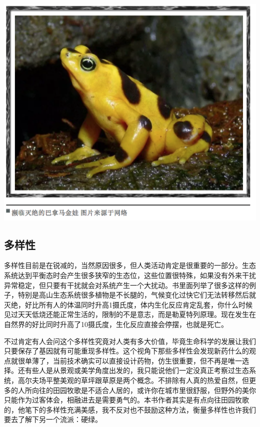 \documentclass[
]{book}
\begin{document}
\includegraphics[width=8.33in]{images/miejue5}

\hypertarget{ux591aux6837ux6027}{%
\subsection{多样性}\label{ux591aux6837ux6027}}

多样性目前是在锐减的，当然原因很多，但人类活动肯定是很重要的一部分。生态系统达到平衡态时会产生很多狭窄的生态位，这些位置很特殊，如果没有外来干扰异常稳定，但只要有干扰就会对系统产生一个大扰动。书里面列举了很多这样的例子，特别是高山生态系统很多植物是不长腿的，气候变化过快它们无法转移然后就灭绝，好比所有人的体温同时升高1摄氏度，体内生化反应肯定乱套，你什么时候见过天天低烧还能正常生活的，限制的不是意志，而是勒夏特列原理。现在发生在自然界的好比同时升高了10摄氏度，生化反应直接会停摆，也就是死亡。

不过肯定有人会问这个多样性究竟对人类有多大价值，毕竟生命科学的发展让我们只要保存了基因就有可能重现多样性。这个视角下那些多样性会发现新药什么的观点就很单薄了，当前技术确实可以直接设计药物，仿生很重要，但不再是唯一选择。还有些人是从景观或美学角度出发的，我只能说他们一定没真正考察过生态系统，高尔夫场平整美观的草坪跟草原是两个概念。不排除有人真的热爱自然，但更多的人所向往的田园牧歌是不适合人居的，或许你在城市里很舒服，但野外的美你只能作为过客体会，相融进去是需要勇气的。本书作者其实是有点向往田园牧歌的，他笔下的多样性充满美感，我不反对也不鼓励这种方法，衡量多样性也许我们要去了解下另一个流派：硬绿。
\end{document}
